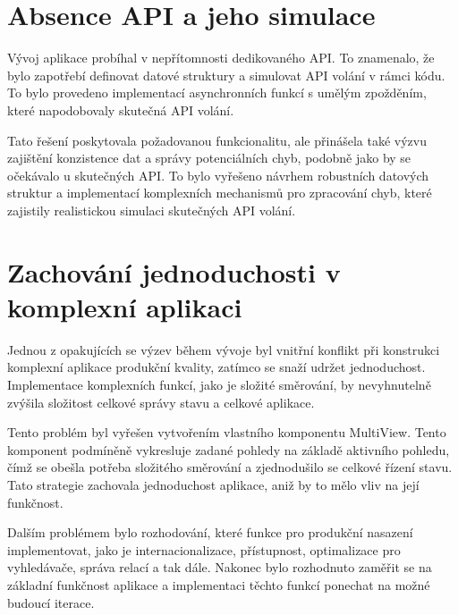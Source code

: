 \section{Absence API a jeho simulace}
\label{sec:vyzvy-a-problemy-absence-api}
Vývoj aplikace probíhal v nepřítomnosti dedikovaného API\@.
To znamenalo, že bylo zapotřebí definovat datové struktury a simulovat API volání v rámci kódu.
To bylo provedeno implementací asynchronních funkcí s umělým zpožděním, které napodobovaly skutečná API volání.

Tato řešení poskytovala požadovanou funkcionalitu, ale přinášela také výzvu zajištění konzistence dat a správy potenciálních chyb, podobně jako by se očekávalo u skutečných API\@.
To bylo vyřešeno návrhem robustních datových struktur a implementací komplexních mechanismů pro zpracování chyb, které zajistily realistickou simulaci skutečných API volání.

\section{Zachování jednoduchosti v komplexní aplikaci}
\label{sec:vyzvy-a-problemy-zachovani-jednoduchosti}
Jednou z opakujících se výzev během vývoje byl vnitřní konflikt při konstrukci komplexní aplikace produkční kvality, zatímco se snaží udržet jednoduchost.
Implementace komplexních funkcí, jako je složité směrování, by nevyhnutelně zvýšila složitost celkové správy stavu a celkové aplikace.

Tento problém byl vyřešen vytvořením vlastního komponentu MultiView.
Tento komponent podmíněně vykresluje zadané pohledy na základě aktivního pohledu, čímž se obešla potřeba složitého směrování a zjednodušilo se celkové řízení stavu.
Tato strategie zachovala jednoduchost aplikace, aniž by to mělo vliv na její funkčnost.

Dalším problémem bylo rozhodování, které funkce pro produkční nasazení implementovat, jako je internacionalizace, přístupnost, optimalizace pro vyhledávače, správa relací a tak dále.
Nakonec bylo rozhodnuto zaměřit se na základní funkčnost aplikace a implementaci těchto funkcí ponechat na možné budoucí iterace.

